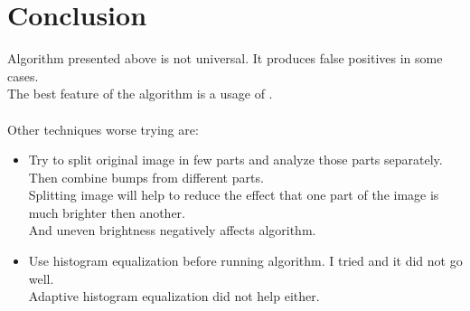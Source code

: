 \documentclass[14pt, letterpaper]{article}
\begin{document}
\section{Conclusion}
Algorithm presented above is not universal. It produces false positives in some cases.\\
The best feature of the algorithm is a usage of .\\\\
Other techniques worse trying are:
\begin{itemize}
	\item Try to split original image in few parts and analyze those parts separately.\\
	Then combine bumps from different parts.\\
	Splitting image will help to reduce the effect that one part of the image is much brighter then another.\\
	And uneven brightness negatively affects algorithm.
	\item Use histogram equalization before running algorithm. I tried and it did not go well.\\
	Adaptive histogram equalization did not help either.
\end{itemize}
\end{document}
